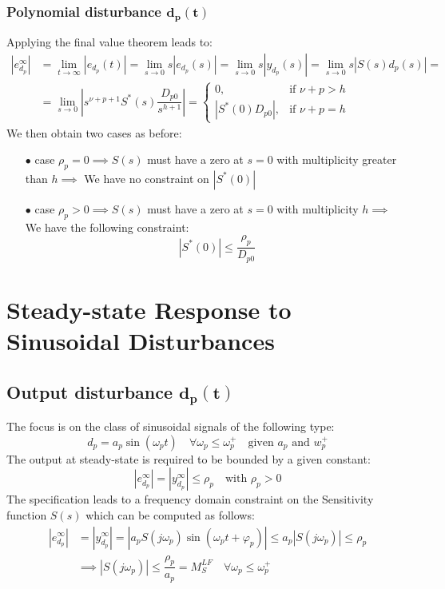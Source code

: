 \documentclass{article}
\numberwithin{equation}{subsection}
\begin{document}
	\subsubsection{Polynomial disturbance $\boldsymbol{d_p(t)}$}
	Applying the final value theorem leads to:
	\begin{align}
		\left| e_{d_p}^\infty \right| &= \displaystyle\lim_{t\to\infty} 	\left|e_{d_p}(t)\right| = \displaystyle\lim_{s\to0}s \left|e_{d_p}(s)\right| = \displaystyle\lim_{s\to0}s \left|y_{d_p}(s)\right| = \displaystyle\lim_{s\to0}s \left| S(s)d_p(s) \right| = \nonumber \\
		&= \displaystyle\lim_{s\to0}	\left|s^{\nu+p+1}S^*(s)\dfrac{D_{p0}}{s^{h+1}}\right| =
		\begin{cases}
			0, & \text{if } \nu+p>h \\
			\left|S^*(0)D_{p0}\right|, & \text{if } \nu+p = h
		\end{cases}
	\end{align}
	We then obtain two cases as before:
	\begin{enumerate}
		\item[$\bullet$] case $\rho_p=0 \implies S(s)$ must have a zero at $s=0$ with multiplicity greater than $h \implies$ We have no constraint on $\left|S^*(0)\right| $ 
		\item[$\bullet$] case $\rho_p>0 \implies S(s)$ must have a zero at $s=0$ with multiplicity $h \implies$ We have the following constraint:
		\begin{equation}
			\left|S^*(0)\right| \leq \dfrac{\rho_p}{D_{p0}}	
		\end{equation}
	\end{enumerate}
	
	\section{Steady-state Response to Sinusoidal Disturbances}
	\subsection{Output disturbance $\boldsymbol{d_p(t)}$}
	The focus is on the class of sinusoidal signals of the following type:
	\begin{equation}
		d_p = a_p\sin(\omega_pt) \quad \forall\omega_p\leq\omega_p^+ \quad \text{given } a_p \text{ and } w_p^+
	\end{equation}
	The output at steady-state is required to be bounded by a given constant:
	\begin{equation}
		\left| e_{d_p}^\infty \right| = \left| y_{d_p}^\infty \right| \leq \rho_p \quad \text{with } \rho_p>0
	\end{equation}
	The specification leads to a frequency domain constraint on the Sensitivity function $S(s)$ which can be computed as follows:
	\begin{align}
		\left| e_{d_p}^\infty \right| &= \left| y_{d_p}^\infty \right| = \left| a_pS(j\omega_p)\sin(\omega_pt+\varphi_p) \right| \leq a_p\left|S(j\omega_p)\right| \leq \rho_p \nonumber \\
		&\implies \left|S(j\omega_p)\right| \leq \dfrac{\rho_p}{a_p} = M_S^{LF} \quad \forall\omega_p \leq \omega_p^+
	\end{align}
	
\end{document}
